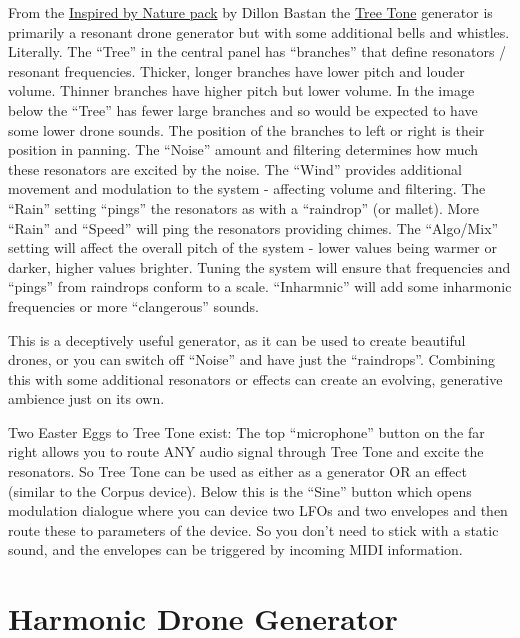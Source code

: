 \documentclass[
  12pt,
  letterpaper,
  oneside,
  open=any]{scrbook}
\makeatletter
\newcommand*\pandocbounded[1]{%
  \sbox\pandoc@box{#1}%
  \Gscale@div\@tempa{\textheight}{\dimexpr\ht\pandoc@box+\dp\pandoc@box\relax}%
  \Gscale@div\@tempb{\linewidth}{\wd\pandoc@box}%
  \ifdim\@tempb\p@<\@tempa\p@\let\@tempa\@tempb\fi%
  \ifdim\@tempa\p@<\p@\scalebox{\@tempa}{\usebox\pandoc@box}%
  \else\usebox{\pandoc@box}%
  \fi%
}
\makeatother
\begin{document}
From the
\href{https://www.ableton.com/en/packs/inspired-nature/\#?item_type=max_for_live}{Inspired
by Nature pack} by Dillon Bastan the
\href{https://www.youtube.com/watch?v=_mk7qyzEcCQ}{Tree Tone} generator
is primarily a resonant drone generator but with some additional bells
and whistles. Literally. The ``Tree'' in the central panel has
``branches'' that define resonators / resonant frequencies. Thicker,
longer branches have lower pitch and louder volume. Thinner branches
have higher pitch but lower volume. In the image below the ``Tree'' has
fewer large branches and so would be expected to have some lower drone
sounds. The position of the branches to left or right is their position
in panning. The ``Noise'' amount and filtering determines how much these
resonators are excited by the noise. The ``Wind'' provides additional
movement and modulation to the system - affecting volume and filtering.
The ``Rain'' setting ``pings'' the resonators as with a ``raindrop'' (or
mallet). More ``Rain'' and ``Speed'' will ping the resonators providing
chimes. The ``Algo/Mix'' setting will affect the overall pitch of the
system - lower values being warmer or darker, higher values brighter.
Tuning the system will ensure that frequencies and ``pings'' from
raindrops conform to a scale. ``Inharmnic'' will add some inharmonic
frequencies or more ``clangerous'' sounds.

This is a deceptively useful generator, as it can be used to create
beautiful drones, or you can switch off ``Noise'' and have just the
``raindrops''. Combining this with some additional resonators or effects
can create an evolving, generative ambience just on its own.

Two Easter Eggs to Tree Tone exist: The top ``microphone'' button on the
far right allows you to route ANY audio signal through Tree Tone and
excite the resonators. So Tree Tone can be used as either as a generator
OR an effect (similar to the Corpus device). Below this is the ``Sine''
button which opens modulation dialogue where you can device two LFOs and
two envelopes and then route these to parameters of the device. So you
don't need to stick with a static sound, and the envelopes can be
triggered by incoming MIDI information.

\pandocbounded{\texttt{[image: images/Tree\_tone.png]}}

\section{Harmonic Drone Generator}\label{harmonic-drone-generator}
\end{document}
